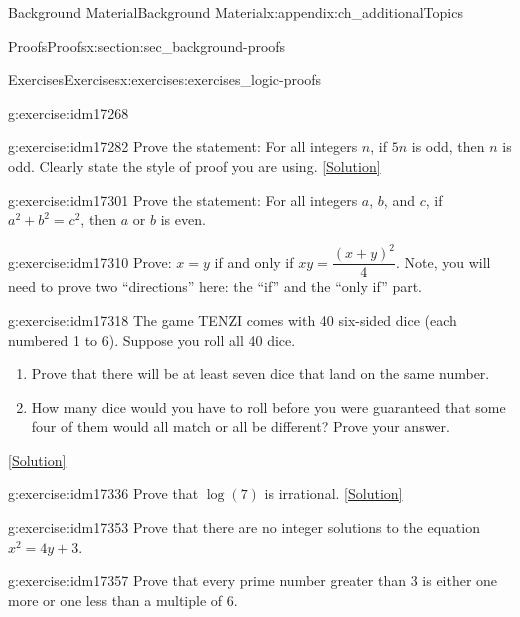 \documentclass[oneside,10pt,]{book}
\numberwithin{equation}{chapter}
\begin{document}
\begin{appendixptx}{Background Material}{}{Background Material}{}{}{x:appendix:ch_additionalTopics}
\begin{sectionptx}{Proofs}{}{Proofs}{}{}{x:section:sec_background-proofs}
\begin{exercises-subsection}{Exercises}{}{Exercises}{}{}{x:exercises:exercises_logic-proofs}
\begin{divisionexercise}{7}{}{}{g:exercise:idm17268}
\begin{enumerate}[label=(\alph*)]
\end{enumerate}
%
\end{divisionexercise}%
\begin{divisionexercise}{8}{}{}{g:exercise:idm17282}%
Prove the statement: For all integers \(n\), if \(5n\) is odd, then \(n\) is odd. Clearly state the style of proof you are using.%
\space\hspace*{0pt}\hfill{\tiny\hyperlink{g:solution:idm17288-main}{[Solution]}}\end{divisionexercise}%
\begin{divisionexercise}{9}{}{}{g:exercise:idm17301}%
Prove the statement: For all integers \(a\), \(b\), and \(c\), if \(a^2 + b^2 = c^2\), then \(a\) or \(b\) is even.%
\end{divisionexercise}%
\begin{divisionexercise}{10}{}{}{g:exercise:idm17310}%
Prove: \(x=y\) if and only if \(xy=\dfrac{(x+y)^2}{4}\). Note, you will need to prove two ``directions'' here: the ``if'' and the ``only if'' part.%
\end{divisionexercise}%
\begin{divisionexercise}{11}{}{}{g:exercise:idm17318}%
The game TENZI comes with 40 six-sided dice (each numbered 1 to 6). Suppose you roll all 40 dice.%
\begin{enumerate}[label=(\alph*)]
\item{}Prove that there will be at least seven dice that land on the same number.%
\item{}How many dice would you have to roll before you were guaranteed that some four of them would all match or all be different? Prove your answer.%
\end{enumerate}
%
\space\hspace*{0pt}\hfill{\tiny\hyperlink{g:solution:idm17325-main}{[Solution]}}\end{divisionexercise}%
\begin{divisionexercise}{12}{}{}{g:exercise:idm17336}%
Prove that \(\log(7)\) is irrational.%
\space\hspace*{0pt}\hfill{\tiny\hyperlink{g:solution:idm17340-main}{[Solution]}}\end{divisionexercise}%
\begin{divisionexercise}{13}{}{}{g:exercise:idm17353}%
Prove that there are no integer solutions to the equation \(x^2 = 4y + 3\).%
\end{divisionexercise}%
\begin{divisionexercise}{14}{}{}{g:exercise:idm17357}%
Prove that every prime number greater than 3 is either one more or one less than a multiple of 6.%

\end{divisionexercise}
\end{exercises-subsection}
\end{sectionptx}
\end{appendixptx}
\end{document}
